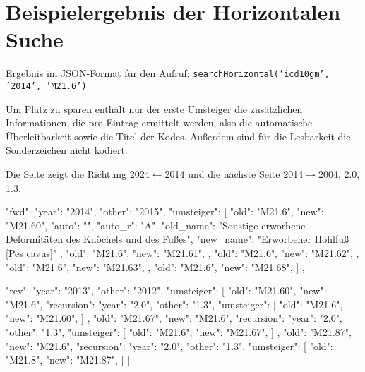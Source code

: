 \section{Beispielergebnis der Horizontalen Suche}
\label{search-horizontal-example}

Ergebnis im JSON-Format für den Aufruf: \newline \texttt{searchHorizontal('icd10gm', '2014', 'M21.6')}

Um Platz zu sparen enthält nur der erste Umsteiger die zusätzlichen Informationen, die pro Eintrag ermittelt werden, also die automatische Überleitbarkeit sowie die Titel der Kodes. Außerdem sind für die Lesbarkeit die Sonderzeichen nicht kodiert.

Die Seite zeigt die Richtung 2024$\leftarrow$2014 und die nächste Seite 2014$\rightarrow$2004, 2.0, 1.3. \\

\begin{Code}
{
  "fwd": {
    "year": "2014",
    "other": "2015",
    "umsteiger": [
      {
        "old": "M21.6",
        "new": "M21.60",
        "auto": "",
        "auto_r": "A",
        "old_name": "Sonstige erworbene Deformitäten des Knöchels und des Fußes",
        "new_name": "Erworbener Hohlfuß [Pes cavus]"
      },
      {
        "old": "M21.6",
        "new": "M21.61",
      },
      {
        "old": "M21.6",
        "new": "M21.62",
      },
      {
        "old": "M21.6",
        "new": "M21.63",
      },
      {
        "old": "M21.6",
        "new": "M21.68",
      }
    ]
  },







  "rev": {
    "year": "2013",
    "other": "2012",
    "umsteiger": [
      {
        "old": "M21.60",
        "new": "M21.6",
        "recursion": {
          "year": "2.0",
          "other": "1.3",
          "umsteiger": [
            {
              "old": "M21.6",
              "new": "M21.60",
            }
          ]
        }
      },
      {
        "old": "M21.67",
        "new": "M21.6",
        "recursion": {
          "year": "2.0",
          "other": "1.3",
          "umsteiger": [
            {
              "old": "M21.6",
              "new": "M21.67",
            }
          ]
        }
      },
      {
        "old": "M21.87",
        "new": "M21.6",
        "recursion": {
          "year": "2.0",
          "other": "1.3",
          "umsteiger": [
            {
              "old": "M21.8",
              "new": "M21.87",
            }
          ]
        }
      }
    ]
  }
}
\end{Code}


